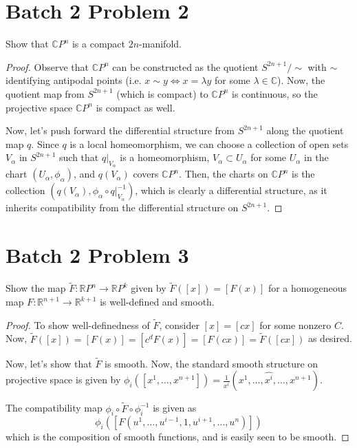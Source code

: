 \documentclass[fontsize=11pt]{scrartcl} %
\numberwithin{equation}{section} %
\numberwithin{figure}{section} %
\numberwithin{table}{section} %
\begin{document}
\section*{Batch 2 Problem 2}
Show that $\mathbb{C}P^n$ is a compact $2n$-manifold.
\\
\begin{proof}
Observe that $\mathbb{C}P^n$ can be constructed as the quotient $S^{2n+1}/\sim$
with $\sim$ identifying antipodal points (i.e. $x\sim y \iff x = \lambda y$ for some $\lambda\in\mathbb{C}$). 
Now, the quotient map from $S^{2n+1}$
(which is compact) to $\mathbb{C}P^n$ is continuous, so the projective space
$\mathbb{C}P^n$ is compact as well.

Now, let's push forward the differential structure from $S^{2n+1}$ along the quotient map $q$.
Since $q$ is a local homeomorphism, we can choose a collection of open sets $V_{\alpha}$ in $S^{2n+1}$
such that $q|_{V_{\alpha}}$ is a homeomorphism, $V_{\alpha}\subset U_{\alpha}$ for some $U_{\alpha}$ in the
chart $(U_{\alpha},\phi_{\alpha})$, and $q(V_{\alpha})$ covers $\mathbb{C}P^n$.
Then, the charts on $\mathbb{C}P^n$ is the collection $(q(V_{\alpha}),\phi_{\alpha}\circ q|_{V_{\alpha}}^{-1})$,
which is clearly a differential structure, as it inherits compatibility from the differential structure on $S^{2n+1}$.
\end{proof}

\section*{Batch 2 Problem 3}
Show the map $\widetilde{F}: \mathbb{R}P^n\to\mathbb{R}P^k$ given by $\widetilde{F}([x]) = [F(x)]$ for a
homogeneous map $F:\mathbb{R}^{n+1}\to\mathbb{R}^{k+1}$ is well-defined and smooth.
\\
\begin{proof}
To show well-definedness of $\widetilde{F}$, consider $[x] = [cx]$ for some nonzero $C$.
Now, $\widetilde{F}([x]) = [F(x)] = [c^dF(x)] = [F(cx)] = \widetilde{F}([cx])$ as desired.

Now, let's show that $\widetilde{F}$ is smooth. Now, the standard smooth structure on projective
space is given by $\phi_i([x^1,\ldots,x^{n+1}]) = \frac{1}{x^i}(x^1,\ldots,\hat{x^i},\ldots,x^{n+1})$.

The compatibility map $\phi_i\circ\widetilde{F}\circ\phi_i^{-1}$ is given as
\[
\phi_i([F(u^1,\ldots,u^{i-1},1,u^{i+1},\ldots,u^n)])
\]
which is the composition of smooth functions, and is easily seen to be smooth.
\end{proof}
\end{document}
